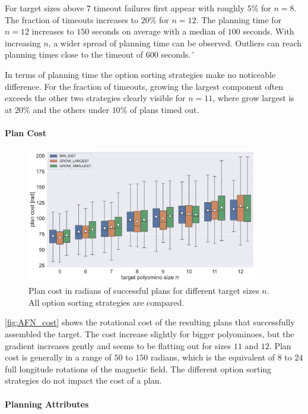 For target sizes above $7$ timeout failures first appear with roughly $5\%$ for $n = 8$.
The fraction of timeouts increases to $20\%$ for $n=12$.
The planning time for $n = 12$ increases to $150$ seconds on average with a median of $100$ seconds.
With increasing $n$, a wider spread of planning time can be observed.
Outliers can reach planning times close to the timeout of $600$ seconds.´

In terms of planning time the option sorting strategies make no noticeable difference.
For the fraction of timeouts, growing the largest component often exceeds the other two strategies clearly visible for $n=11$, where grow largest is at $20\%$ and the others under $10\%$ of plans timed out.


\paragraph{Plan Cost}

\begin{figure}
	\centering
	\includegraphics[width=0.9\textwidth]{figures/plots/AFN_cost.pdf}
	\caption[Plan cost for different target sizes]{Plan cost in radians of successful plans for different target sizes $n$. All option sorting strategies are compared.}
	\label{fig:AFN_cost}
\end{figure}

\autoref{fig:AFN_cost} shows the rotational cost of the resulting plans that successfully assembled the target.
The cost increase slightly for bigger polyominoes, but the gradient increases gently and seems to be flatting out for sizes $11$ and $12$.
Plan cost is generally in a range of $50$ to $150$ radians, which is the equivalent of $8$ to $24$ full longitude rotations of the magnetic field.
The different option sorting strategies do not impact the cost of a plan.

\paragraph{Planning Attributes}

